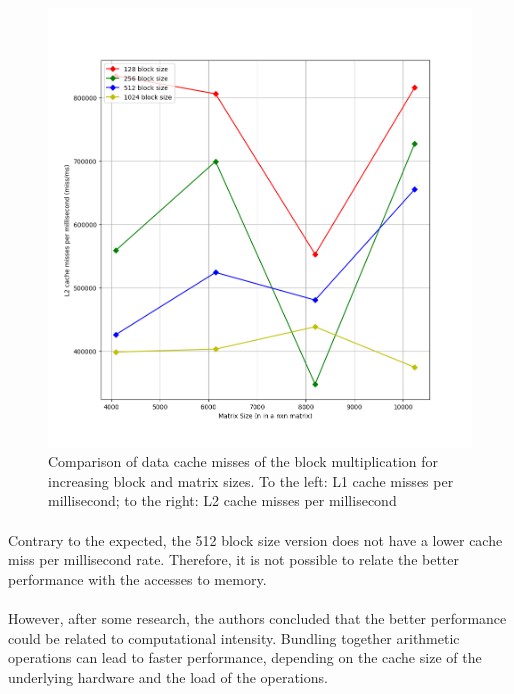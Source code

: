 \documentclass{report}
\begin{document}
\begin{figure}[H]
\begin{adjustbox}{center}
						\includegraphics[scale=0.4]{cpp_block_l2_misses.png}
					\end{adjustbox}
					\caption{Comparison of data cache misses of the block multiplication for increasing block and matrix sizes. To the left: L1 cache misses per millisecond; to the right: L2 cache misses per millisecond}
				\end{figure}
			
				\paragraph{}Contrary to the expected, the 512 block size version does not have a lower cache miss per millisecond rate. Therefore, it is not possible to relate the better performance with the accesses to memory.
				
				\paragraph{}However, after some research, the authors concluded that the better performance could be related to computational intensity. Bundling together arithmetic operations can lead to faster performance, depending on the cache size of the underlying hardware and the load of the operations. \cite{1}
		
\end{document}
